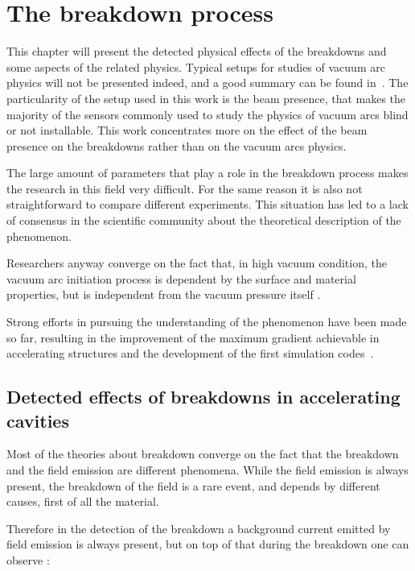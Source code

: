 \chapter[The breakdown process]{The breakdown process}
\label{chap:BDs}

This chapter will present the detected physical effects of the breakdowns and some aspects of the related physics. Typical setups for studies of vacuum arc physics will not be presented indeed, and a good summary can be found in~\cite{Kovermann:1330346}. The particularity of the setup used in this work is the beam presence, that makes the majority of the sensors commonly used to study the physics of vacuum arcs blind or not installable. This work concentrates more on the effect of the beam presence on the breakdowns rather than on the vacuum arcs physics. 

The large amount of parameters that play a role in the breakdown process makes the research in this field very difficult. For the same reason it is also not straightforward to compare different experiments. This situation has led to a lack of consensus in the scientific community about the theoretical description of the phenomenon.

Researchers anyway converge on the fact that, in high vacuum condition, the vacuum arc initiation process is dependent by the surface and material properties, but is independent from the vacuum pressure itself \cite{alpert:triggers}.

Strong efforts in pursuing the understanding of the phenomenon have been made so far, resulting in the improvement of the maximum gradient achievable in accelerating structures and the development of the first simulation codes~\cite{Insepov:1373092}.



\section[Detected effects of breakdowns in accelerating cavities]{Detected effects of breakdowns in accelerating cavities}
\label{sec:affects_of_BD}

Most of the theories about breakdown converge on the fact that the breakdown and the field emission are different phenomena. While the field emission is always present, the breakdown of the field is a rare event, and depends by different causes, first of all the material.

Therefore in the detection of the breakdown a background current emitted by field emission is always present, but on top of that during the breakdown one can observe \cite{Wuensch:583549}:

